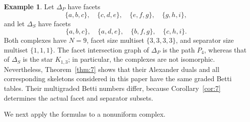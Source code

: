 \documentclass[11pt]{amsart}
\theoremstyle{definition}
\newtheorem{example}[theorem]{Example}
\theoremstyle{remark}
\begin{document}
	\begin{example}\label{ex:1}
		Let $\Delta_P$ have facets
		\[
		\{a,b,c\},\quad \{c,d,e\},\quad \{e,f,g\},\quad \{g,h,i\},
		\]
		and let $\Delta_S$ have facets
		\[
		\{a,b,c\},\quad \{a,d,e\},\quad \{b,f,g\},\quad \{c,h,i\}.
		\]
		Both complexes have $N=9$, facet size multiset $\{3,3,3,3\}$, and separator size multiset $\{1,1,1\}$. The facet intersection graph of $\Delta_P$ is the path $P_4$, whereas that of $\Delta_S$ is the star $K_{1,3}$; in particular, the complexes are not isomorphic. Nevertheless, Theorem~\ref{thm:7} shows that their Alexander duals and all corresponding skeletons considered in this paper have the same graded Betti tables. Their multigraded Betti numbers differ, because Corollary~\ref{cor:7} determines the actual facet and separator subsets.
	\end{example}
	
	We next apply the formulas to a nonuniform complex.
	
\end{document}
